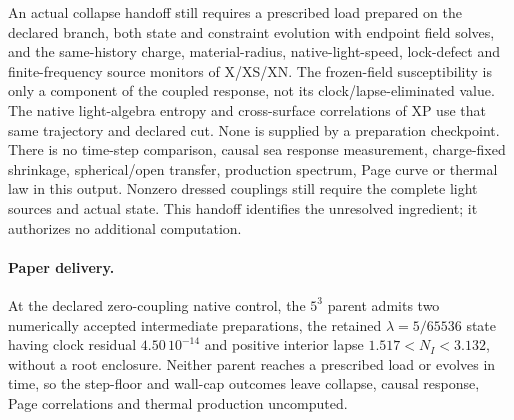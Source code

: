 \documentclass[11pt]{article}
\begin{document}
An actual collapse handoff still requires a prescribed
load prepared on the declared branch, both state and
constraint evolution with endpoint field solves, and the
same-history charge, material-radius, native-light-speed,
lock-defect and finite-frequency source monitors of X/XS/XN.
The frozen-field susceptibility is only a component of
the coupled response, not its clock/lapse-eliminated value.
The native light-algebra entropy and cross-surface
correlations of XP use that same trajectory and declared
cut.  None is supplied by a preparation checkpoint.
There is no time-step comparison, causal sea response
measurement, charge-fixed shrinkage, spherical/open
transfer, production spectrum, Page curve or thermal
law in this output.  Nonzero dressed couplings still
require the complete light sources and actual state.
This handoff identifies the unresolved ingredient;
it authorizes no additional computation.

\paragraph{Paper delivery.}
At the declared zero-coupling native control, the $5^3$ parent
admits two numerically accepted intermediate preparations,
the retained $\lambda=5/65536$ state having clock residual
$4.50\,10^{-14}$ and positive interior lapse
$1.517<N_I<3.132$, without a root enclosure.
Neither parent reaches a prescribed load or evolves in time,
so the step-floor and wall-cap outcomes leave collapse,
causal response, Page correlations and thermal production
uncomputed.
\end{document}

